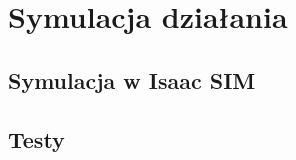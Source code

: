 \chapter{Symulacja działania}
\label{cha:symulacja}

\section{Symulacja w Isaac SIM}
\label{sec:sym_isaac}

\section{Testy}
\label{sec:testy}